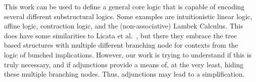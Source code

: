 This work can be used to define a general core logic that is capable
of encoding several different substructural logics.  Some examples are
intuitionistic linear logic, affine logic, contraction logic, and the
(non-associative) Lambek Calculus.  This does have some similarities
to Licata et al.~\cite{licata2017fibrational}, but there they embrace
the tree based structures with multiple different branching node for
contexts from the logic of bunched implications.  However, our work is
trying to understand if this is truly necessary, and if adjunctions
provide a means of, at the very least, hiding these multiple branching
nodes.  Thus, adjunctions may lead to a simplification.

